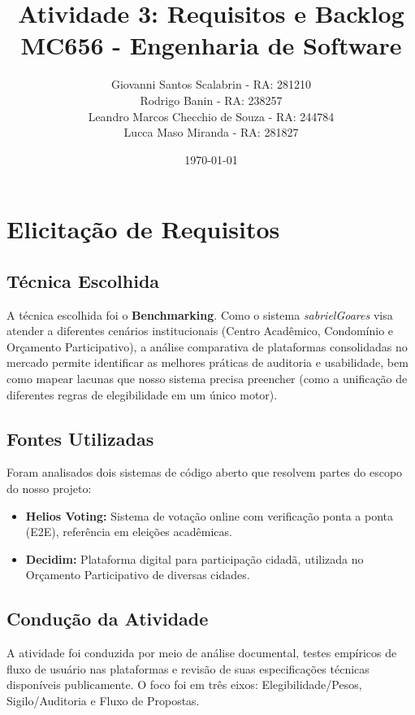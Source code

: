 \documentclass[12pt,a4paper]{article}
\title{\textbf{Atividade 3: Requisitos e Backlog} \\ \large MC656 - Engenharia de Software}
\author{
    Giovanni Santos Scalabrin - RA: 281210 \\
    Rodrigo Banin - RA: 238257 \\
    Leandro Marcos Checchio de Souza - RA: 244784 \\
    Lucca Maso Miranda - RA: 281827
}
\date{\today}
\begin{document}
\maketitle

\section{Elicitação de Requisitos}

\subsection{Técnica Escolhida}
A técnica escolhida foi o \textbf{Benchmarking}. 
Como o sistema \textit{sabrielGoares} visa atender a diferentes cenários institucionais (Centro Acadêmico, Condomínio e Orçamento Participativo), a análise comparativa de plataformas consolidadas no mercado permite identificar as melhores práticas de auditoria e usabilidade, bem como mapear lacunas que nosso sistema precisa preencher (como a unificação de diferentes regras de elegibilidade em um único motor).

\subsection{Fontes Utilizadas}
Foram analisados dois sistemas de código aberto que resolvem partes do escopo do nosso projeto:
\begin{itemize}
    \item \textbf{Helios Voting:} Sistema de votação online com verificação ponta a ponta (E2E), referência em eleições acadêmicas.
    \item \textbf{Decidim:} Plataforma digital para participação cidadã, utilizada no Orçamento Participativo de diversas cidades.
\end{itemize}

\subsection{Condução da Atividade}
A atividade foi conduzida por meio de análise documental, testes empíricos de fluxo de usuário nas plataformas e revisão de suas especificações técnicas disponíveis publicamente. O foco foi em três eixos: Elegibilidade/Pesos, Sigilo/Auditoria e Fluxo de Propostas.
\end{document}
